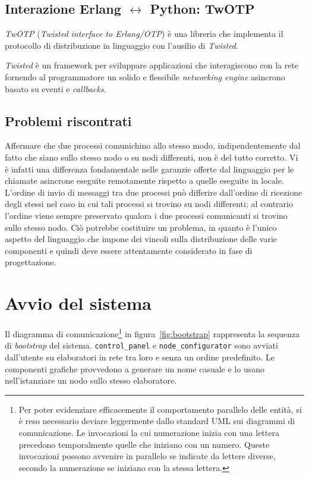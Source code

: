 \subsection*{Interazione Erlang $\leftrightarrow$ Python: TwOTP}
\textsl{TwOTP} (\textit{Twisted interface to Erlang/OTP}) è una libreria che implementa il protocollo di distribuzione \Erlang{} in linguaggio \Python{} con l'ausilio di \textsl{Twisted}.

\textsl{Twisted} è un framework per sviluppare applicazioni che interagiscono con la rete fornendo al programmatore un solido e flessibile \textit{networking engine} asincrono basato su eventi e \textit{callbacks}.

\subsection*{Problemi riscontrati}
Affermare che due processi comunichino allo stesso modo, indipendentemente dal fatto che siano sullo stesso nodo o su nodi differenti, non è del tutto corretto. Vi è infatti una differenza fondamentale nelle garanzie offerte dal linguaggio per le chiamate asincrone eseguite remotamente rispetto a quelle eseguite in locale. L'ordine di invio di messaggi tra due processi può differire dall'ordine di ricezione degli stessi nel caso in cui tali processi si trovino su nodi differenti; al contrario l'ordine viene sempre preservato qualora i due processi comunicanti si trovino sullo stesso nodo. Ciò potrebbe costituire un problema, in quanto è l'unico aspetto del linguaggio che impone dei vincoli sulla distribuzione delle varie componenti e quindi deve essere attentamente considerato in fase di progettazione.

\section{Avvio del sistema}
\label{sec:avvio}

Il diagramma di comunicazione\footnote{Per poter evidenziare efficacemente il comportamento parallelo delle entità, si è reso necessario deviare leggermente dallo standard UML sui diagrammi di comunicazione. Le invocazioni la cui numerazione inizia con una lettera precedono temporalmente quelle che iniziano con un numero. Queste invocazioni possono avvenire in parallelo se indicate da lettere diverse, secondo la numerazione se iniziano con la stessa lettera.} in figura~\ref{fig:bootstrap} rappresenta la sequenza di \textit{bootstrap} del sistema. \texttt{control\_panel} e \texttt{node\_configurator} sono avviati dall'utente su elaboratori in rete tra loro e senza un ordine predefinito. Le componenti grafiche provvedono a generare un nome casuale e lo usano nell'istanziare un nodo \Erlang{} sullo stesso elaboratore.

